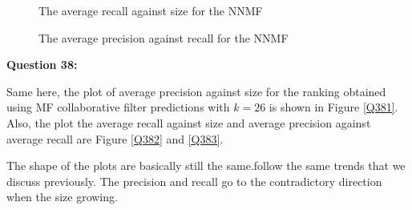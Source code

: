 \documentclass{article}
\begin{document}
\begin{figure}
\centering
{}
\caption{The average recall against size for the NNMF} 
\label{Q372}
\end{figure}

\begin{figure}
\centering
{}
\caption{The average precision against recall for the NNMF} 
\label{Q373}
\end{figure}

\bigbreak \textbf{Question 38:}

Same here, the plot of average precision against size for the ranking obtained using MF collaborative filter predictions with $k = 26$ is shown in Figure \ref{Q381}. Also, the plot the average recall against size and average precision against average recall are Figure \ref{Q382} and \ref{Q383}.

The shape of the plots are basically still the same.follow the same trends that we discuss previously. The precision and recall go to the contradictory direction   when the size growing.
\end{document}
